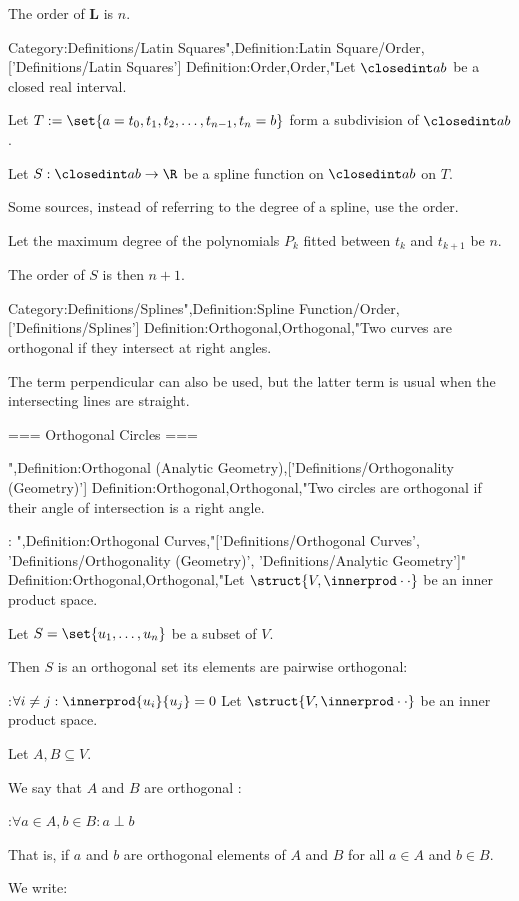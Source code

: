 The order of $\mathbf L$ is $n$.


Category:Definitions/Latin Squares",Definition:Latin Square/Order,['Definitions/Latin Squares']
Definition:Order,Order,"Let $\closedint a b$ be a closed real interval.

Let $T := \set {a = t_0, t_1, t_2, \ldots, t_{n - 1}, t_n = b}$ form a subdivision of $\closedint a b$.

Let $S: \closedint a b \to \R$ be a spline function on $\closedint a b$ on $T$.


Some sources, instead of referring to the degree of a spline, use the order.

Let the maximum degree of the polynomials $P_k$ fitted between $t_k$ and $t_{k + 1}$ be $n$.

The order of $S$ is then $n + 1$.


Category:Definitions/Splines",Definition:Spline Function/Order,['Definitions/Splines']
Definition:Orthogonal,Orthogonal,"Two curves are orthogonal if they intersect at right angles.

The term perpendicular can also be used, but the latter term is usual when the intersecting lines are straight.


=== Orthogonal Circles ===

",Definition:Orthogonal (Analytic Geometry),['Definitions/Orthogonality (Geometry)']
Definition:Orthogonal,Orthogonal,"Two circles are orthogonal if their angle of intersection is a right angle.


:
",Definition:Orthogonal Curves,"['Definitions/Orthogonal Curves', 'Definitions/Orthogonality (Geometry)', 'Definitions/Analytic Geometry']"
Definition:Orthogonal,Orthogonal,"Let $\struct {V, \innerprod \cdot \cdot}$ be an inner product space.

Let $S = \set {u_1, \ldots, u_n}$ be a subset of $V$.


Then $S$ is an orthogonal set  its elements are pairwise orthogonal:

:$\forall i \ne j: \innerprod {u_i} {u_j} = 0$
Let $\struct {V, \innerprod \cdot \cdot}$ be an inner product space.

Let $A, B \subseteq V$.

We say that $A$ and $B$ are orthogonal :

:$\forall a \in A, b \in B: a \perp b$

That is, if $a$ and $b$ are orthogonal elements of $A$ and $B$ for all $a \in A$ and $b \in B$.


We write: 

